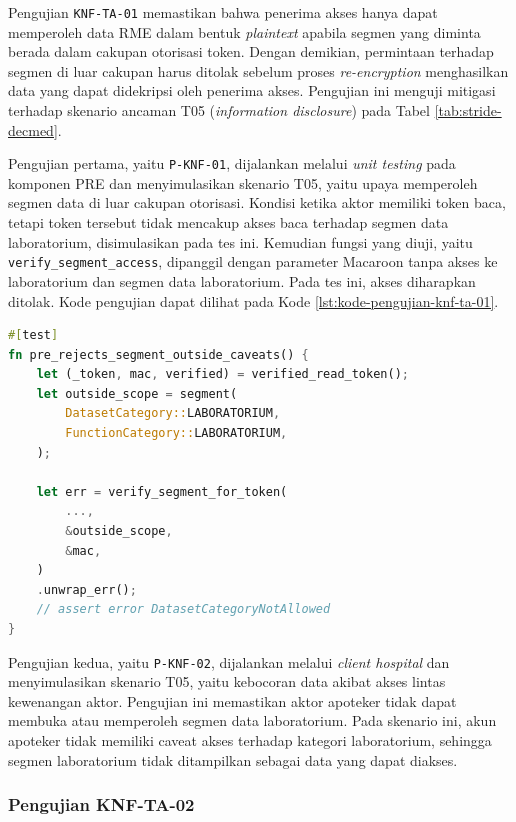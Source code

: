 \documentclass[bahasa, 12pt, a4paper, onecolumn, oneside, final]{report}
\begin{document}
Pengujian \texttt{KNF-TA-01} memastikan bahwa penerima akses hanya dapat memperoleh data RME dalam bentuk \textit{plaintext} apabila segmen yang diminta berada dalam cakupan otorisasi token. Dengan demikian, permintaan terhadap segmen di luar cakupan harus ditolak sebelum proses \textit{re-encryption} menghasilkan data yang dapat didekripsi oleh penerima akses. Pengujian ini menguji mitigasi terhadap skenario ancaman T05 (\textit{information disclosure}) pada Tabel \ref{tab:stride-decmed}.

Pengujian pertama, yaitu \texttt{P-KNF-01}, dijalankan melalui \textit{unit testing} pada komponen PRE dan menyimulasikan skenario T05, yaitu upaya memperoleh segmen data di luar cakupan otorisasi. Kondisi ketika aktor memiliki token baca, tetapi token tersebut tidak mencakup akses baca terhadap segmen data laboratorium, disimulasikan pada tes ini. Kemudian fungsi yang diuji, yaitu \texttt{verify\_segment\_access}, dipanggil dengan parameter Macaroon tanpa akses ke laboratorium dan segmen data laboratorium. Pada tes ini, akses diharapkan ditolak. Kode pengujian dapat dilihat pada Kode \ref{lst:kode-pengujian-knf-ta-01}.

\begin{lstlisting}[language=Rust, caption=Pengujian P-KNF-01 untuk KNF-TA-01, label=lst:kode-pengujian-knf-ta-01]
#[test]
fn pre_rejects_segment_outside_caveats() {
	let (_token, mac, verified) = verified_read_token();
	let outside_scope = segment(
		DatasetCategory::LABORATORIUM,
		FunctionCategory::LABORATORIUM,
	);

	let err = verify_segment_for_token(
		...,
		&outside_scope,
		&mac,
	)
	.unwrap_err();
	// assert error DatasetCategoryNotAllowed
}
\end{lstlisting}

Pengujian kedua, yaitu \texttt{P-KNF-02}, dijalankan melalui \textit{client hospital} dan menyimulasikan skenario T05, yaitu kebocoran data akibat akses lintas kewenangan aktor. Pengujian ini memastikan aktor apoteker tidak dapat membuka atau memperoleh segmen data laboratorium. Pada skenario ini, akun apoteker tidak memiliki caveat akses terhadap kategori laboratorium, sehingga segmen laboratorium tidak ditampilkan sebagai data yang dapat diakses.

\subsubsection{Pengujian KNF-TA-02}
\label{subsubsec:pengujian-knf-ta-02}
\end{document}
